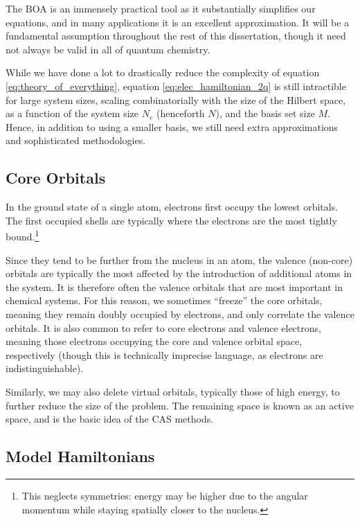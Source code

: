 The \gls{BOA} is an immensely practical tool as it substantially simplifies our equations, and in many applications it is an excellent approximation. It will be a fundamental assumption throughout the rest of this dissertation, though it need not always be valid in all of quantum chemistry.

While we have done a lot to drastically reduce the complexity of equation \eqref{eq:theory_of_everything}, equation \eqref{eq:elec_hamiltonian_2q} is still intractible for large system sizes, scaling combinatorially with the size of the Hilbert space, as a function of the system size $N_e$ (henceforth $N$), and the basis set size $M$. Hence, in addition to using a smaller basis, we still need extra approximations and sophisticated methodologies.


\subsection{Core Orbitals}
\label{sec:core_electrons}

In the ground state of a single atom, electrons first occupy the lowest orbitals. The first occupied shells are typically where the electrons are the most tightly bound.\footnote{This neglects symmetries: energy may be higher due to the angular momentum while staying spatially closer to the nucleus.}

Since they tend to be further from the nucleus in an atom, the valence (non-core) orbitals are typically the most affected by the introduction of additional atoms in the system. It is therefore often the valence orbitals that are most important in chemical systems. For this reason, we sometimes ``freeze'' the core orbitals, meaning they remain doubly occupied by electrons, and only correlate the valence orbitals. It is also common to refer to core electrons and valence electrons, meaning those electrons occupying the core and valence orbital space, respectively (though this is technically imprecise language, as electrons are indistinguishable).

Similarly, we may also delete virtual orbitals, typically those of high energy, to further reduce the size of the problem. The remaining space is known as an active space, and is the basic idea of the \gls{CAS} methods.

\subsection{Model Hamiltonians}

